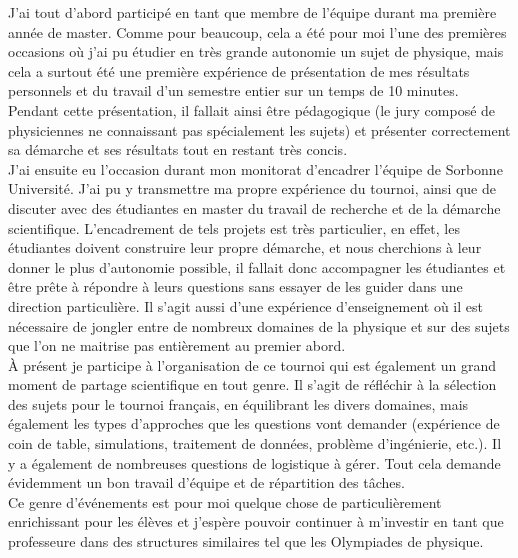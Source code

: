 \documentclass[a4paper,11pt]{article} %
\newcommand{\pointmedian}{\fontfamily{cmr}\selectfont\textperiodcentered}
\begin{document}
	J'ai tout d'abord participé en tant que membre de l'équipe durant ma première année de master. Comme pour beaucoup, cela a été pour moi l'une des premières occasions où j'ai pu étudier en très grande autonomie un sujet de physique, mais cela a surtout été une première expérience de présentation de mes résultats personnels et du travail d'un semestre entier sur un temps de 10 minutes. Pendant cette présentation, il fallait ainsi être pédagogique (le jury composé de physicien\pointmedian nes ne connaissant pas spécialement les sujets) et présenter correctement sa démarche et ses résultats tout en restant très concis.\\
	
	J'ai ensuite eu l'occasion durant mon monitorat d'encadrer l'équipe de Sorbonne Université. J'ai pu y transmettre ma propre expérience du tournoi, ainsi que de discuter avec des étudiant\pointmedian es en master du travail de recherche et de la démarche scientifique. L'encadrement de tels projets est très particulier, en effet, les étudiant\pointmedian es doivent construire leur propre démarche, et nous cherchions à leur donner le plus d'autonomie possible, il fallait donc accompagner les étudiant\pointmedian es et être prête à répondre à leurs questions sans essayer de les guider dans une direction particulière. Il s'agit aussi d'une expérience d'enseignement où il est nécessaire de jongler entre de nombreux domaines de la physique et sur des sujets que l'on ne maitrise pas entièrement au premier abord.\\
	
	\`A présent je participe à l'organisation de ce tournoi qui est également un grand moment de partage scientifique en tout genre. Il s'agit de réfléchir à la sélection des sujets pour le tournoi français, en équilibrant les divers domaines, mais également les types d'approches que les questions vont demander (expérience de coin de table, simulations, traitement de données, problème d'ingénierie, etc.). Il y a également de nombreuses questions de logistique à gérer. Tout cela demande évidemment un bon travail d'équipe et de répartition des tâches.\\ %
	
	Ce genre d'événements est pour moi quelque chose de particulièrement enrichissant pour les élèves et j'espère pouvoir continuer à m'investir en tant que professeure dans des structures similaires tel que les Olympiades de physique.
	
\end{document}
